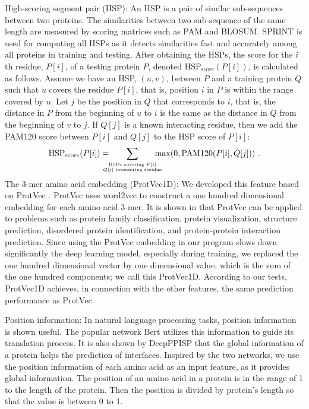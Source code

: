 \documentclass{bioinfo}
\begin{document}
\begin{methods}
High-scoring segment pair (HSP): An HSP is a pair of similar sub-sequences between two proteins. The similarities between two sub-sequence of the same length are measured by scoring matrices such as PAM and BLOSUM. SPRINT \citep{li2017sprint} is used for computing all HSPs as it detects similarities fast and accurately among all proteins in training and testing. After obtaining the HSPs, the score for the $i$th residue, $P[i]$, of a testing protein $P$, denoted $\text{HSP}_{\text{score}}(P[i])$, is calculated as follows. Assume we have an HSP, $(u,v)$, between $P$ and a training protein $Q$ such that $u$ covers the residue $P[i]$, that is, position $i$ in $P$ is within the range covered by $u$. Let $j$ be the position in $Q$ that corresponds to $i$, that is, the distance in $P$ from the beginning of $u$ to $i$ is the same as the distance in $Q$ from the beginning of $v$ to $j$. If $Q[j]$ is a known interacting residue, then we add the PAM120 score between $P[i]$ and $Q[j]$ to the HSP score of $P[i]$:
\[
\text{HSP}_{\text{score}}(P[i]) = \!\!\!\!\!\!\sum_{\stackrel{\text{\tiny HSPs covering $P[i]$}}{\text{\tiny $Q[j]$ interacting residue}}}\!\!\!\!\!\! \max(0, \text{PAM120}(P[i], Q[j])) \ .
\]
The 3-mer amino acid embedding (ProtVec1D): We developed this feature based on ProtVec \citep{asgari2015continuous}. ProtVec uses word2vec \citep{mikolov2013distributed} to construct a one hundred dimensional embedding for each amino acid 3-mer. It is shown in \citep{asgari2015continuous} that ProtVec can be applied to problems such as protein family classification, protein visualization, structure prediction, disordered protein identification, and protein-protein interaction prediction. Since using the ProtVec embedding in our program slows down significantly the deep learning model, especially during training, we replaced the one hundred dimensional vector by one dimensional value, which is the sum of the one hundred components; we call this ProtVec1D. According to our tests, ProtVec1D achieves, in connection with the other features, the same prediction performance as ProtVec.

Position information: In natural language processing tasks, position information is shown useful. The popular network Bert \citep{devlin2018bert} utilizes this information to guide its translation process. It is also shown by DeepPPISP \citep{zeng2019protein} that the global information of a protein helps the prediction of interfaces. Inspired by the two networks, we use the position information of each amino acid as an input feature, as it provides global information. The position of an amino acid in a protein is in the range of 1 to the length of the protein. Then the position is divided by protein's length so that the value is between 0 to 1.


\end{methods}
\end{document}
